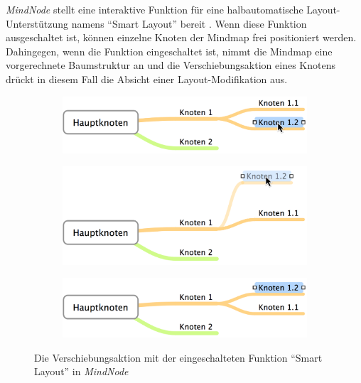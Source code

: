 \textit{MindNode} stellt eine interaktive Funktion für eine halbautomatische Layout-Unterstützung namens \enquote{Smart Layout} bereit \cite{14MindNode}. Wenn diese Funktion ausgeschaltet ist, können einzelne Knoten der Mindmap frei positioniert werden. Dahingegen, wenn die Funktion eingeschaltet ist, nimmt die Mindmap eine vorgerechnete Baumstruktur an und die Verschiebungsaktion eines Knotens drückt in diesem Fall die Absicht einer Layout-Modifikation aus.

\begin{figure}[hbt]
    \newcommand{\subfigurewidth}{\textwidth}
    \newcommand{\graphicsscale}{0.25}
    \begin{subfigure}{\subfigurewidth}
        \centering
        \includegraphics[scale=\graphicsscale]{resources/mindnode-smart-layout-a}
        \caption{}
        \label{fig:mindnode-smart-layout-a}
    \end{subfigure}
    \begin{subfigure}{\subfigurewidth}
        \centering
        \includegraphics[scale=\graphicsscale]{resources/mindnode-smart-layout-b}
        \caption{}
        \label{fig:mindnode-smart-layout-b}
    \end{subfigure}
    \begin{subfigure}{\subfigurewidth}
        \centering
        \includegraphics[scale=\graphicsscale]{resources/mindnode-smart-layout-c}
        \caption{}
        \label{fig:mindnode-smart-layout-c}
    \end{subfigure}
    \caption{Die Verschiebungsaktion mit der eingeschalteten Funktion \enquote{Smart Layout} in \textit{MindNode}}
    \label{fig:mindnode-smart-layout}
\end{figure}

